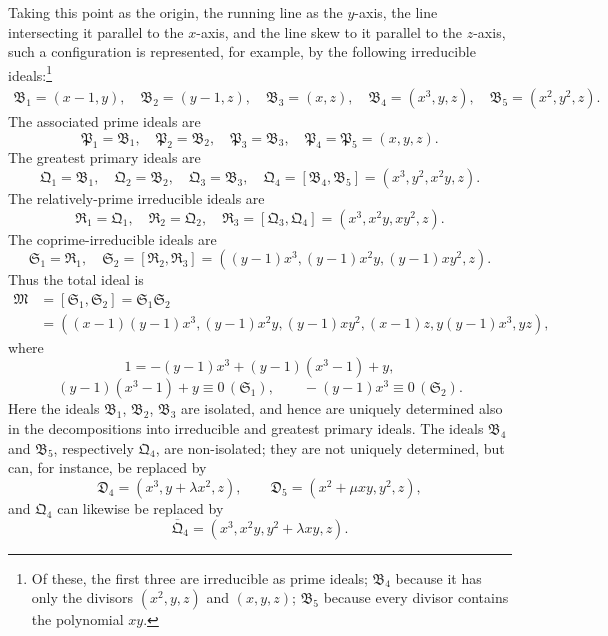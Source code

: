 \documentclass[11pt]{article}
\newcommand{\ideal}[1]{\mathfrak{#1}}
\newcommand{\eqzero}[1]{\equiv 0\,(#1)}
\begin{document}
Taking this point as the origin, the running line as the $y$-axis, the line intersecting it parallel to the $x$-axis, and the line skew to it parallel to the $z$-axis, such a configuration is represented, for example, by the following irreducible ideals:\footnote{Of these, the first three are irreducible as prime ideals; $\ideal B_4$ because it has only the divisors $(x^2,y,z)$ and $(x,y,z)$; $\ideal B_5$ because every divisor contains the polynomial $xy$.}
\[
\begin{gathered}
 \ideal B_1=(x-1,y),\quad
 \ideal B_2=(y-1,z),\quad
 \ideal B_3=(x,z),\quad
 \ideal B_4=(x^3,y,z),\quad
 \ideal B_5=(x^2,y^2,z).
\end{gathered}
\]
The associated prime ideals are
\[
 \ideal P_1=\ideal B_1,
 \quad \ideal P_2=\ideal B_2,
 \quad \ideal P_3=\ideal B_3,
 \quad \ideal P_4=\ideal P_5=(x,y,z).
\]
The greatest primary ideals are
\[
 \ideal Q_1=\ideal B_1,
 \quad \ideal Q_2=\ideal B_2,
 \quad \ideal Q_3=\ideal B_3,
 \quad \ideal Q_4=[\ideal B_4,\ideal B_5]=(x^3,y^2,x^2y,z).
\]
The relatively-prime irreducible ideals are
\[
 \ideal R_1=\ideal Q_1,
 \quad \ideal R_2=\ideal Q_2,
 \quad \ideal R_3=[\ideal Q_3,\ideal Q_4]=(x^3,x^2y,xy^2,z).
\]
The coprime-irreducible ideals are
\[
 \ideal S_1=\ideal R_1,
 \quad
 \ideal S_2=[\ideal R_2,\ideal R_3]=((y-1)x^3,(y-1)x^2y,(y-1)xy^2,z).
\]
Thus the total ideal is
\[
\begin{aligned}
 \ideal M&=[\ideal S_1,\ideal S_2]=\ideal S_1\ideal S_2 \\
 &=((x-1)(y-1)x^3,(y-1)x^2y,(y-1)xy^2,(x-1)z,y(y-1)x^3,yz),
\end{aligned}
\]
where
\[
 1=-(y-1)x^3+(y-1)(x^3-1)+y,
\]
\[
 (y-1)(x^3-1)+y\eqzero{\ideal S_1},
 \qquad -(y-1)x^3\eqzero{\ideal S_2}.
\]
Here the ideals $\ideal B_1$, $\ideal B_2$, $\ideal B_3$ are isolated, and hence are uniquely determined also in the decompositions into irreducible and greatest primary ideals. The ideals $\ideal B_4$ and $\ideal B_5$, respectively $\ideal Q_4$, are non-isolated; they are not uniquely determined, but can, for instance, be replaced by
\[
 \ideal D_4=(x^3,y+\lambda x^2,z),
 \qquad
 \ideal D_5=(x^2+\mu xy,y^2,z),
\]
and $\ideal Q_4$ can likewise be replaced by
\[
 \overline{\ideal Q}_4=(x^3,x^2y,y^2+\lambda xy,z).
\]
\end{document}
